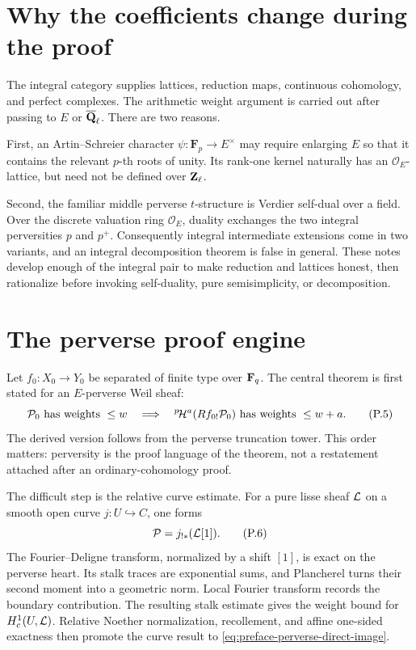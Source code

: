 \section*{Why the coefficients change during the proof}

The integral category supplies lattices, reduction maps, continuous
cohomology, and perfect complexes.  The arithmetic weight argument is carried
out after passing to \(E\) or \(\overline{\mathbf Q}_\ell\).  There are two reasons.

First, an Artin--Schreier character
\(\psi:\mathbf F_p\to E^\times\) may require enlarging \(E\) so that it
contains the relevant \(p\)-th roots of unity.  Its rank-one kernel naturally
has an \(\mathcal O_E\)-lattice, but need not be defined over \(\mathbf Z_\ell\).

Second, the familiar middle perverse \(t\)-structure is Verdier self-dual over
a field.  Over the discrete valuation ring \(\mathcal O_E\), duality exchanges
the two integral perversities \(p\) and \(p^+\).  Consequently integral
intermediate extensions come in two variants, and an integral decomposition
theorem is false in general.  These notes develop enough of the integral
pair to make reduction and lattices honest, then rationalize before invoking
self-duality, pure semisimplicity, or decomposition.

\section*{The perverse proof engine}

Let \(f_0:X_0\to Y_0\) be separated of finite type over \(\mathbf F_q\).  The central
theorem is first stated for an \(E\)-perverse Weil sheaf:
\[
 \mathcal P_0\text{ has weights }\leq w
 \quad\Longrightarrow\quad
 {}^{p}\!\mathcal H^a(Rf_{0!}\mathcal P_0)
 \text{ has weights }\leq w+a.
\tag{P.5}\label{eq:preface-perverse-direct-image}
\]
The derived version follows from the perverse truncation tower.  This order
matters: perversity is the proof language of the theorem, not a restatement
attached after an ordinary-cohomology proof.

The difficult step is the relative curve estimate.  For a pure lisse sheaf
\(\mathcal L\) on a smooth open curve \(j:U\hookrightarrow C\), one forms
\[
  \mathcal P=j_{!*}(\mathcal L[1]).
\tag{P.6}\label{eq:preface-curve-perverse-object}
\]
The Fourier--Deligne transform, normalized by a shift \([1]\), is exact on
the perverse heart.  Its stalk traces are exponential sums, and Plancherel
turns their second moment into a geometric norm.  Local Fourier transform
records the boundary contribution.  The resulting stalk estimate gives the
weight bound for \(H_c^1(U,\mathcal L)\).  Relative Noether normalization,
recollement, and affine one-sided exactness then promote the curve result to
\eqref{eq:preface-perverse-direct-image}.

